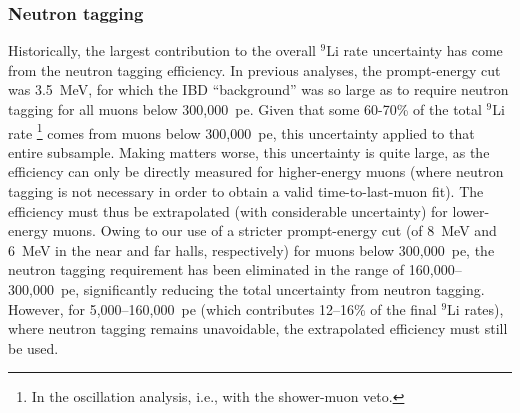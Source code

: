 \documentclass[../thesis.tex]{subfiles}
\begin{document}

\subsubsection{Neutron tagging}
\label{sec:bkgLi9NeuTagEff}

Historically, the largest contribution to the overall $^9$Li rate uncertainty has come from the neutron tagging efficiency. In previous analyses, the prompt-energy cut was 3.5~MeV, for which the IBD ``background'' was so large as to require neutron tagging for all muons below 300,000~pe. Given that some 60-70\% of the total $^9$Li rate \footnote{In the oscillation analysis, i.e., with the shower-muon veto.} comes from muons below 300,000~pe, this uncertainty applied to that entire subsample. Making matters worse, this uncertainty is quite large, as the efficiency can only be directly measured for higher-energy muons (where neutron tagging is not necessary in order to obtain a valid time-to-last-muon fit). The efficiency must thus be extrapolated (with considerable uncertainty) for lower-energy muons. Owing to our use of a stricter prompt-energy cut (of 8~MeV and 6~MeV in the near and far halls, respectively) for muons below 300,000~pe, the neutron tagging requirement has been eliminated in the range of 160,000--300,000~pe, significantly reducing the total uncertainty from neutron tagging. However, for 5,000--160,000~pe (which contributes 12--16\% of the final $^9$Li rates), where neutron tagging remains unavoidable, the extrapolated efficiency must still be used.
\end{document}
